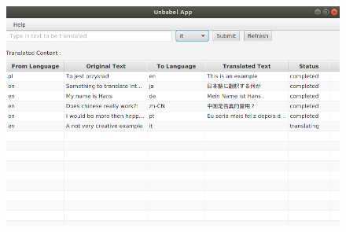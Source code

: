 \documentclass[12pt]{article}
\begin{document}
\begin{figure}
\includegraphics[scale=0.5]{appExample.png}
\end{figure}
\end{document}
